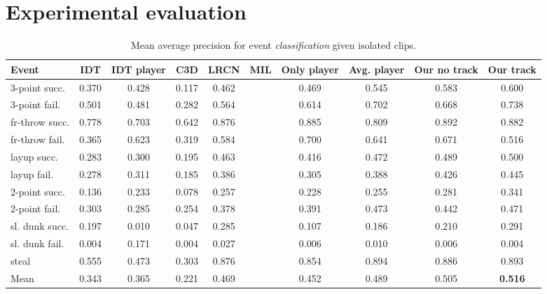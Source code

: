 
\section{Experimental evaluation}
\label{sec:experiments}

\begin{table}[ht!]
\begin{center}
\small
 \begin{tabular}{|l|c|c|c|c|c|c|c|c|c|}
  \hline
Event & IDT\cite{Wang_CVPR11} & IDT\cite{Wang_CVPR11} player & C3D \cite{Tran_arxiv14} & LRCN \cite{Donahue_arxiv14} & MIL\cite{} & Only player & Avg. player & Our no track & Our track \\ \hline \hline

3-point succ.    & 0.370 & 0.428 & 0.117 & 0.462 &  & 0.469 & 0.545 & 0.583 & 0.600 \\
3-point fail.    & 0.501 &  0.481& 0.282 & 0.564 &  & 0.614 & 0.702 & 0.668 & 0.738 \\
fr-throw succ. & 0.778 &  0.703& 0.642 & 0.876 &  & 0.885 & 0.809 & 0.892 & 0.882 \\
fr-throw fail. & 0.365 &  0.623& 0.319 & 0.584 &  & 0.700 & 0.641 & 0.671 & 0.516 \\
layup succ.      & 0.283 & 0.300 & 0.195 & 0.463 &  & 0.416 & 0.472 & 0.489 & 0.500 \\
layup fail.      & 0.278 &0.311  & 0.185 & 0.386 &  & 0.305 & 0.388 & 0.426 & 0.445 \\
2-point succ.    & 0.136 &  0.233 & 0.078 & 0.257 &  & 0.228 & 0.255 & 0.281 & 0.341 \\
2-point fail.    & 0.303 &  0.285 & 0.254 & 0.378 &  & 0.391 & 0.473 & 0.442 & 0.471 \\
sl. dunk succ.  & 0.197 &  0.010 & 0.047 & 0.285 &  & 0.107 & 0.186 & 0.210 & 0.291 \\
sl. dunk fail.  & 0.004 &  0.171& 0.004 & 0.027 &  & 0.006 & 0.010 & 0.006 & 0.004 \\
steal            & 0.555 &  0.473& 0.303 & 0.876 &  & 0.854 & 0.894 & 0.886 & 0.893 \\ \hline \hline
Mean             & 0.343 &  0.365 & 0.221 & 0.469 &  & 0.452 & 0.489 & 0.505 & \textbf{0.516} \\ \hline
  \end{tabular}
\end{center}
  \caption{Mean average precision for event {\em classification} given
    isolated clips.}
  \label{tab:event_class}
  \label{tab:class_res}
\end{table}


